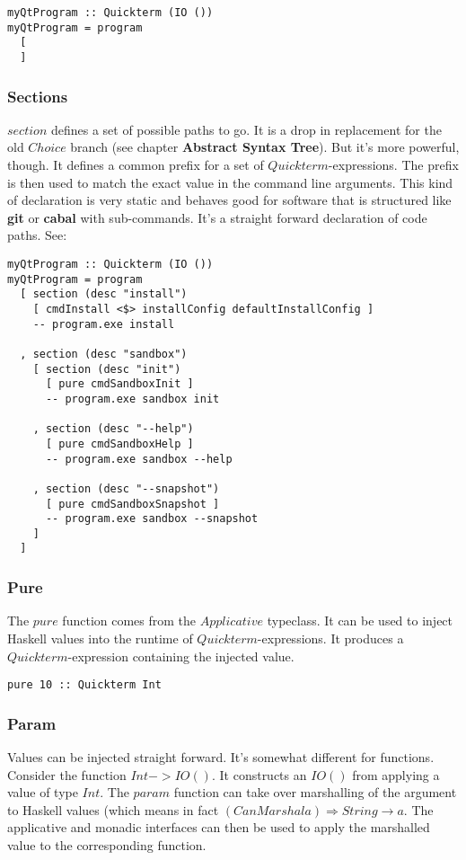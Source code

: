 \documentclass[a4paper]{article}
\begin{document}
\begin{lstlisting}
myQtProgram :: Quickterm (IO ())
myQtProgram = program
  [
  ]
\end{lstlisting}

\subsubsection{Sections}
$section$ defines a set of possible paths to go. It is a drop in replacement for the old $Choice$ branch (see chapter \textbf{Abstract Syntax Tree}). But it's more powerful, though. It defines a common prefix for a set of $Quickterm$-expressions. The prefix is then used to match the exact value in the command line arguments. This kind of declaration is very static and behaves good for software that is structured like \textbf{git} or \textbf{cabal} with sub-commands. It's a straight forward declaration of code paths. See:

\begin{lstlisting}
myQtProgram :: Quickterm (IO ())
myQtProgram = program
  [ section (desc "install")
    [ cmdInstall <$> installConfig defaultInstallConfig ]
    -- program.exe install
    
  , section (desc "sandbox")
    [ section (desc "init")
      [ pure cmdSandboxInit ]
      -- program.exe sandbox init
      
    , section (desc "--help")
      [ pure cmdSandboxHelp ]
      -- program.exe sandbox --help
      
    , section (desc "--snapshot")
      [ pure cmdSandboxSnapshot ]
      -- program.exe sandbox --snapshot
    ]
  ]
\end{lstlisting}

\subsubsection{Pure}
The $pure$ function comes from the $Applicative$ typeclass. It can be used to inject Haskell values into the runtime of $Quickterm$-expressions. It produces a $Quickterm$-expression containing the injected value.

\begin{lstlisting}
pure 10 :: Quickterm Int
\end{lstlisting}

\subsubsection{Param}
Values can be injected straight forward. It's somewhat different for functions. Consider the function $Int -> IO ()$. It constructs an $IO ()$ from applying a value of type $Int$. The $param$ function can take over marshalling of the argument to Haskell values (which means in fact $(CanMarshal a) \Rightarrow String \rightarrow a$. The applicative and monadic interfaces can then be used to apply the marshalled value to the corresponding function.
\end{document}
